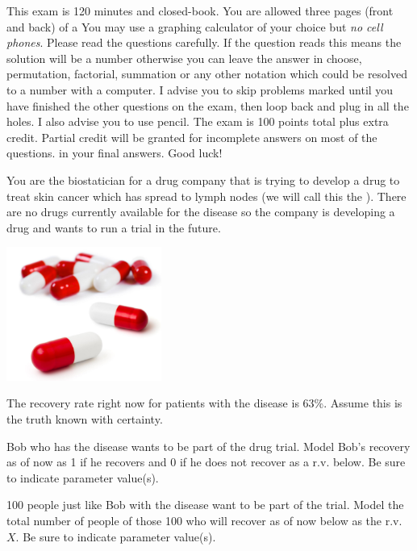 \documentclass[12pt]{article}
\begin{document}
This exam is 120 minutes and closed-book. You are allowed three pages (front and back) of a  You may use a graphing calculator of your choice but \emph{no cell phones}. Please read the questions carefully. If the question reads  this means the solution will be a number otherwise you can leave the answer in choose, permutation, factorial, summation or any other notation which could be resolved to a number with a computer. I advise you to skip problems marked  until you have finished the other questions on the exam, then loop back and plug in all the holes. I also advise you to use pencil. The exam is 100 points total plus extra credit. Partial credit will be granted for incomplete answers on most of the questions.  in your final answers. Good luck!

\pagebreak


\problem You are the biostatician for a drug company that is trying to develop a drug to treat skin cancer which has spread to lymph nodes (we will call this the ). There are no drugs currently available for the disease so the company is developing a drug and wants to run a trial in the future.


\begin{center}
\includegraphics[width=2in]{pills.png}
\end{center}

\noindent The recovery rate right now for patients with the disease is 63\%. Assume this is the truth known with certainty.

\benum
{} Bob who has the disease wants to be part of the drug trial. Model Bob's recovery as of now as 1 if he recovers and 0 if he does not recover as a r.v. below. Be sure to indicate parameter value(s).  

 100 people just like Bob with the disease want to be part of the trial. Model the total number of people of those 100 who will recover as of now below as the r.v. $X$. Be sure to indicate parameter value(s).  
\end{document}
